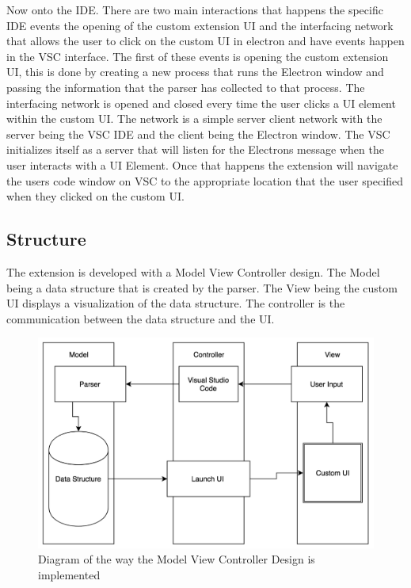 \documentclass[letterpaper,10pt,titlepage,draftclsnofoot,onecolumn,onesided] {IEEEtran}
\begin{document}
Now onto the IDE. 
There are two main interactions that happens the specific IDE events the opening of the custom extension UI and the interfacing network that allows the user to click on the custom UI in electron and have events happen in the VSC interface. 
The first of these events is opening the custom extension UI, this is done by creating a new process that runs the Electron window and passing the information that the parser has collected to that process.  
The interfacing network is opened and closed every time the user clicks a UI element within the custom UI. 
The network is a simple server client network with the server being the VSC IDE and the client being the Electron window. 
The VSC initializes itself as a server that will listen for the Electrons message when the user interacts with a UI Element. 
Once that happens the extension will navigate the users code window on VSC to the appropriate location that the user specified when they clicked on the custom UI.  \\

\subsection{Structure}

The extension is developed with a Model View Controller design.
The Model being a data structure that is created by the parser. 
The View being the custom UI displays a visualization of the data structure.
The controller is the communication between the data structure and the UI.

\begin{figure}[h]
	\centering
	\includegraphics[width=.75\textwidth]{MVCsimple}
	\caption{Diagram of the way the Model View Controller Design is implemented}
\end{figure}

\end{document}
